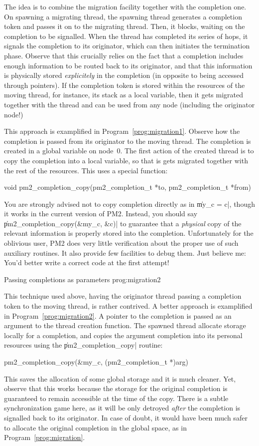 The idea is to combine the migration facility together with the
completion one. On spawning a migrating thread, the spawning thread
generates a completion token and passes it on to the migrating thread.
Then, it blocks, waiting on the completion to be signalled. When the
thread has completed its series of hops, it signals the completion to
its originator, which can then initiates the termination phase.
Observe that this crucially relies on the fact that a completion
includes enough information to be routed back to its originator, and
that this information is physically stored \emph{explicitely} in the
completion (in opposite to being accessed through pointers).  If the
completion token is stored within the resources of the moving thread,
for instance, its stack as a local variable, then it gets migrated
together with the thread and can be used from any node (including the
originator node!)

This approach is examplified in Program~\ref{prog:migration1}. Observe
how the completion is passed from its originator to the moving thread.
The completion is created in a global variable on node~0. The first
action of the created thread is to copy the completion into a local
variable, so that is gets migrated together with the rest of the
resources. This uses a special function: 
\begin{program}
void pm2_completion_copy(pm2_completion_t *to, 
                         pm2_completion_t *from)
\end{program}
You are strongly advised not to copy completion directly as in
\|my_c = c|, though it works in the current version of PM2.
Instead, you should say \|pm2_completion_copy(&my_c, &c)| to
guarantee that a \emph{physical} copy of the relevant information is
properly stored into the completion. Unfortunately for the oblivious
user, PM2 does very little verification about the proper use of such
auxiliary routines. It also provide few facilities to debug them.
Just believe me: You'd better write a correct code at the first
attempt!

 {Passing completions as
  parameters} {prog:migration2}

This technique used above, having the originator thread passing a
completion token to the moving thread, is rather contrived. A better
approach is examplified in Program~\ref{prog:migration2}. A pointer to
the completion is passed as an argument to the thread creation
function. The spawned thread allocate storage locally for a
completion, and copies the argument completion into its personal
resources using the \|pm2_completion_copy| routine:
\begin{program}
pm2_completion_copy(&my_c, (pm2_completion_t *)arg)
\end{program}
This saves the allocation of some global storage and it is much
cleaner. Yet, observe that this works because the storage for the
original completion is guaranteed to remain accessible at the time of
the copy. There is a subtle synchronization game here, as it will be
only detroyed \emph{after} the completion is signalled back to its
originator. In case of doubt, it would have been much safer to
allocate the original completion in the global space, as in
Program~\ref{prog:migration}.

